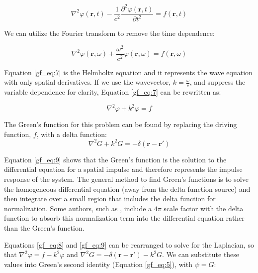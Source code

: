 \begin{equation}
\nabla^2\varphi\left(\mathbf{r},t\right) - \frac{1}{c^2}\frac{\partial^2 \varphi\left(\mathbf{r},t\right)}{\partial t^2} = f\left(\mathbf{r},t\right)
\label{gf_eq:6}
\end{equation}
\renewcommand{\baselinestretch}{2} \small\normalsize

\noindent We can utilize the Fourier transform to remove the time dependence:

\begin{equation}
\nabla^2\varphi\left(\mathbf{r},\omega\right) + \frac{\omega^2}{c^2}\varphi\left(\mathbf{r},\omega\right) = f\left(\mathbf{r},\omega\right)
\label{gf_eq:7}
\end{equation}
\renewcommand{\baselinestretch}{2} \small\normalsize

Equation \ref{gf_eq:7} is the Helmholtz equation and it represents the wave equation with only spatial derivatives. If we use the wavevector, $k = \frac{\omega}{c}$, and suppress the variable dependence for clarity, Equation \ref{gf_eq:7} can be rewritten as:

\begin{equation}
\nabla^2\varphi + k^2\varphi = f
\label{gf_eq:8}
\end{equation}
\renewcommand{\baselinestretch}{2} \small\normalsize

The Green's function for this problem can be found by replacing the driving function, $f$, with a delta function:
\begin{equation}
\nabla^2G+ k^2G = -\delta\left(\mathbf{r}-\mathbf{r}' \right)
\label{gf_eq:9}
\end{equation}
\renewcommand{\baselinestretch}{2} \small\normalsize

Equation \ref{gf_eq:9} shows that the Green's function is the solution to the differential equation for a spatial impulse and therefore represents the impulse response of the system. The general method to find Green's functions is to solve the homogeneous differential equation (away from the delta function source) and then integrate over a small region that includes the delta function for normalization. Some authors, such as \cite{jackson_classical_em}, include a $4\pi$ scale factor with the delta function to absorb this normalization term into the differential equation rather than the Green's function.

Equations \ref{gf_eq:8} and \ref{gf_eq:9} can be rearranged to solve for the Laplacian, so that $\nabla^2\varphi = f - k^2\varphi$ and $\nabla^2G = -\delta\left(\mathbf{r}-\mathbf{r}' \right) - k^2G$. We can substitute these values into Green's second identity (Equation \ref{gf_eq:5}), with $\psi=G$:

